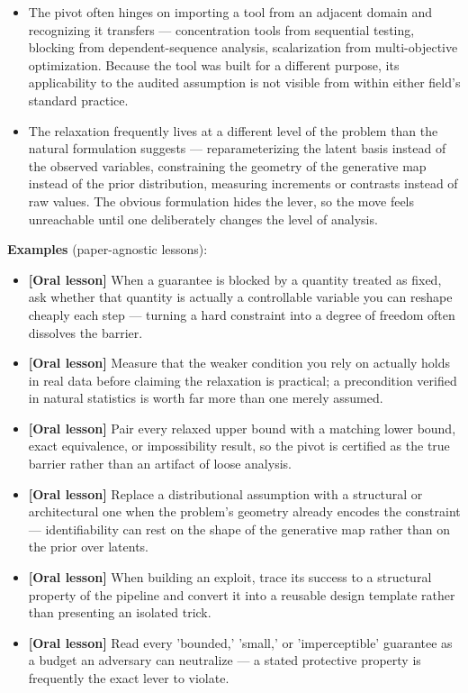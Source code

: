 \begin{tcolorbox}
\begin{itemize}[leftmargin=12pt,topsep=2pt,itemsep=1pt]
  \item The pivot often hinges on importing a tool from an adjacent domain and recognizing it transfers --- concentration tools from sequential testing, blocking from dependent-sequence analysis, scalarization from multi-objective optimization. Because the tool was built for a different purpose, its applicability to the audited assumption is not visible from within either field's standard practice.
  \item The relaxation frequently lives at a different level of the problem than the natural formulation suggests --- reparameterizing the latent basis instead of the observed variables, constraining the geometry of the generative map instead of the prior distribution, measuring increments or contrasts instead of raw values. The obvious formulation hides the lever, so the move feels unreachable until one deliberately changes the level of analysis.
\end{itemize}
\textbf{Examples} (paper-agnostic lessons):
\begin{itemize}[leftmargin=12pt,topsep=2pt,itemsep=1pt]
  \item \textbf{[Oral lesson]} When a guarantee is blocked by a quantity treated as fixed, ask whether that quantity is actually a controllable variable you can reshape cheaply each step --- turning a hard constraint into a degree of freedom often dissolves the barrier.
  \item \textbf{[Oral lesson]} Measure that the weaker condition you rely on actually holds in real data before claiming the relaxation is practical; a precondition verified in natural statistics is worth far more than one merely assumed.
  \item \textbf{[Oral lesson]} Pair every relaxed upper bound with a matching lower bound, exact equivalence, or impossibility result, so the pivot is certified as the true barrier rather than an artifact of loose analysis.
  \item \textbf{[Oral lesson]} Replace a distributional assumption with a structural or architectural one when the problem's geometry already encodes the constraint --- identifiability can rest on the shape of the generative map rather than on the prior over latents.
  \item \textbf{[Oral lesson]} When building an exploit, trace its success to a structural property of the pipeline and convert it into a reusable design template rather than presenting an isolated trick.
  \item \textbf{[Oral lesson]} Read every 'bounded,' 'small,' or 'imperceptible' guarantee as a budget an adversary can neutralize --- a stated protective property is frequently the exact lever to violate.

\end{itemize}
\end{tcolorbox}
